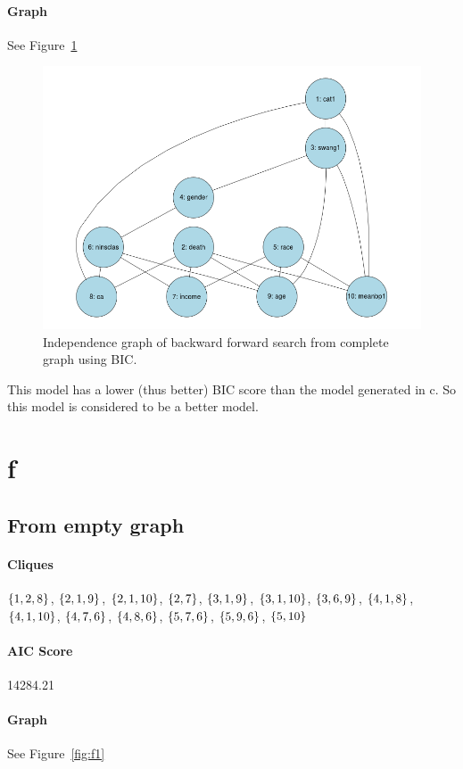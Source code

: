 \documentclass[12pt]{article}
\theoremstyle{definition}
\begin{document}
\paragraph{Graph} See Figure~\ref{fig:e}

\begin{figure}[H]
    \centering
    \includegraphics[width=0.8\linewidth]{e.png}
    \caption{Independence graph of backward forward search from complete graph using BIC.}
\label{fig:e}
\end{figure}

This model has a lower (thus better) BIC score than the model generated in c.
So this model is considered to be a better model.

\section*{f}
\subsection*{From empty graph}
\paragraph{Cliques}
$\set{1,2,8}$, $\set{2,1,9}$, $\set{2,1,10}$, $\set{2,7}$, $\set{3,1,9}$, $\set{3,1,10}$,
$\set{3,6,9}$, $\set{4,1,8}$, $\set{4,1,10}$, $\set{4,7,6}$, $\set{4,8,6}$, $\set{5,7,6}$,
$\set{5,9,6}$, $\set{5,10}$

\paragraph{AIC Score} 14284.21

\paragraph{Graph} See Figure~\ref{fig:f1}
\end{document}
